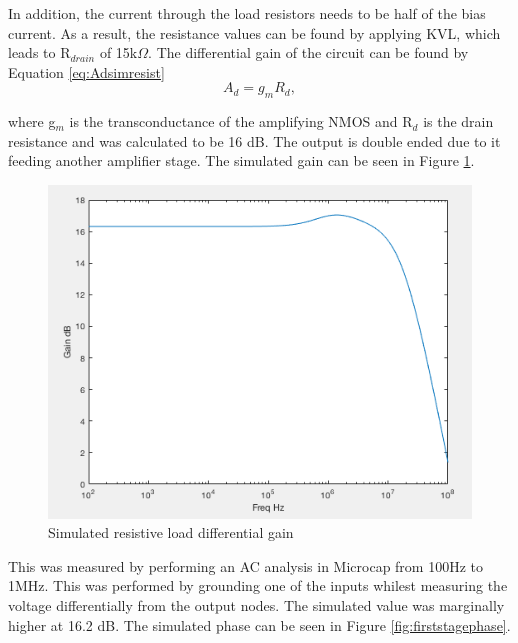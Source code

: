 In addition, the current through the load resistors needs to be half of the bias current. As a result, the resistance values can be found by applying KVL, which leads to R$_{drain}$ of 15k$\Omega$.  The differential gain of the circuit can be found by Equation \ref{eq:Adsimresist} 
\begin{equation}\label{eq:Adsimresist}
A_d = g_m R_d,
\end{equation}

where g$_m$ is the transconductance of the amplifying NMOS and R$_d$ is the drain resistance and was calculated to be 16 dB. The output is double ended due to it feeding another amplifier stage. The simulated gain can be seen in  Figure \ref{fig:adsimresist}.


\begin{figure}[H]
    \begin{center}
    \includegraphics[scale=.30]{Simulations/gainfirststage.png}
    \caption{Simulated resistive load differential gain}
    \label{fig:adsimresist}
    \end{center}
\end{figure}
This was measured by performing an AC analysis in Microcap from 100Hz to 1MHz. This was performed by grounding one of the inputs whilest measuring the voltage differentially from the output nodes. The simulated value was marginally higher at 16.2 dB. The simulated phase can be seen in Figure  \ref{fig:firststagephase}.

